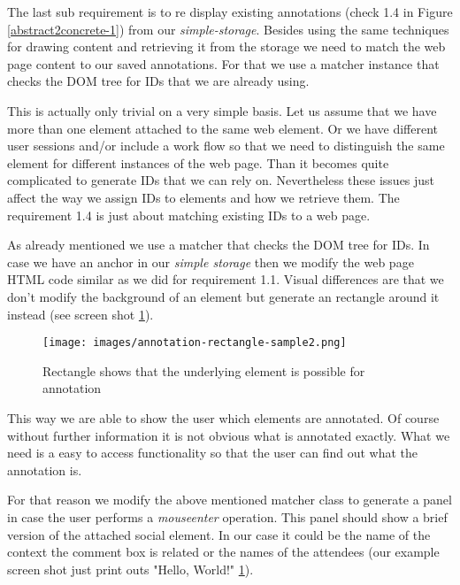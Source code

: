 The last sub requirement is to re display existing annotations (check 1.4 in Figure \ref{abstract2concrete-1}) from our \emph{simple-storage}. Besides using the same techniques for drawing content and retrieving it from the storage we need to match the web page content to our saved annotations. For that we use a matcher instance that checks the DOM tree for IDs that we are already using. 

This is actually only trivial on a very simple basis. Let us assume that we have more than one element attached to the same web element. Or we have different user sessions and/or include a work flow so that we need to distinguish the same element for different instances of the web page. Than it becomes quite complicated to generate IDs that we can rely on. Nevertheless these issues just affect the way we assign IDs to elements and how we retrieve them. The requirement 1.4 is just about matching existing IDs to a web page. 

As already mentioned we use a matcher that checks the DOM tree for IDs. In case we have an anchor in our \emph{simple storage} then we modify the web page HTML code similar as we did for requirement 1.1. Visual differences are that we don't modify the background of an element but generate an rectangle around it instead (see screen shot \ref{annotation-rectangle-sample2}). 

\begin{figure} \centering
		\texttt{[image: images/annotation-rectangle-sample2.png]}
		\caption{Rectangle shows that the underlying element is possible for annotation}
		\label{annotation-rectangle-sample2}
\end{figure} 

This way we are able to show the user which elements are annotated. Of course without further information it is not obvious what is annotated exactly. What we need is a easy to access functionality so that the user can find out what the annotation is. 

For that reason we modify the above mentioned matcher class to generate a panel in case the user performs a \emph{mouseenter} operation. This panel should show a brief version of the attached social element. In our case it could be the name of the context the comment box is related or the names of the attendees (our example screen shot just print outs "Hello, World!" \ref{annotation-rectangle-sample2}). 

\subsubsection[User View Management]{\reqPii}\label{user-disturbance}

